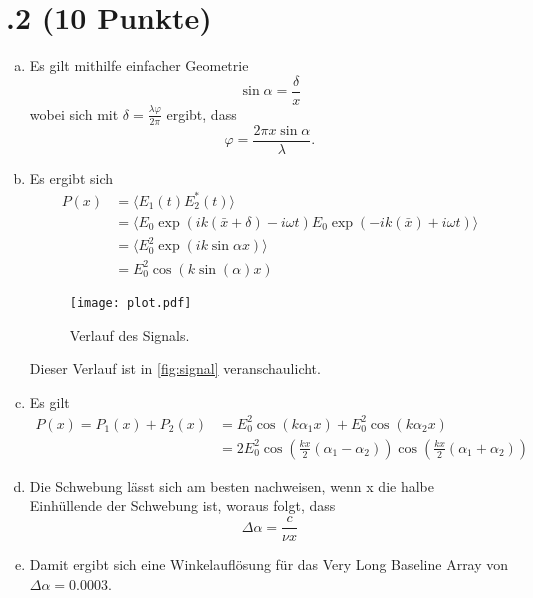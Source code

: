 \section*{\nr.2 \tittwo (10 Punkte)}
\begin{enumerate}[(a)]
\item Es gilt mithilfe einfacher Geometrie
\begin{equation}
  \sin \alpha = \frac{\delta}{x}
\end{equation}
wobei sich mit $\delta = \frac{\lambda \varphi}{2\pi}$ ergibt, dass
\begin{equation}
  \varphi = \frac{2\pi x \sin \alpha}{\lambda}.
\end{equation}
\item Es ergibt sich
\begin{align}
P(x)&=\langle E_1(t)E_2^{*}(t) \rangle\\
    &=\langle E_0\exp(ik(\bar x+\delta)-i\omega t)E_0\exp(-ik(\bar x)+i\omega t) \rangle\\
    &=\langle E_0^2\exp(ik\sin \alpha x) \rangle\\
    &=E_0^2 \cos (k\sin(\alpha)x)
\end{align}
\begin{figure}[htbp]
\centering
\texttt{[image: plot.pdf]}
\caption{Verlauf des Signals.}
\label{fig:signal}
\end{figure}

Dieser Verlauf ist in \vref{fig:signal} veranschaulicht.

\item Es gilt
\begin{align}
  P(x)=P_1(x)+P_2(x)&= E_0^2\cos(k\alpha_1x)+E_0^2\cos(k\alpha_2x)\\
    &=2E_0^2\cos \left( \frac{kx}{2}(\alpha_1-\alpha_2)\right)\cos \left( \frac{kx}{2}(\alpha_1+\alpha_2) \right)
\end{align}

\item Die Schwebung lässt sich am besten nachweisen, wenn x die halbe Einhüllende der Schwebung ist, woraus folgt, dass
\begin{equation}
  \Delta \alpha = \frac{c}{\nu x}
\end{equation}

\item  Damit ergibt sich eine Winkelauflösung für das Very Long Baseline Array von $\Delta \alpha = 0.0003$.

\end{enumerate}
